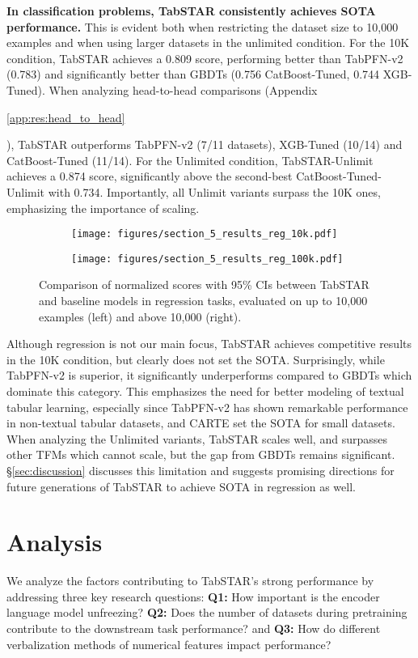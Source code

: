 \documentclass{article}
\newif\ifappendicesincluded
\newcommand{\appref}[1]{%
  \ifappendicesincluded
    \ref{#1}%
  \else
    \ref*{#1}%
  \fi
}
\begin{document}
\textbf{In classification problems, TabSTAR consistently achieves SOTA performance.} This is evident both when restricting the dataset size to 10,000 examples and when using larger datasets in the unlimited condition. For the 10K condition, TabSTAR achieves a 0.809 score, performing better than TabPFN-v2 (0.783) and significantly better than GBDTs (0.756 CatBoost-Tuned, 0.744 XGB-Tuned). When analyzing head-to-head comparisons (Appendix~\appref{app:res:head_to_head}), TabSTAR outperforms TabPFN-v2 (7/11 datasets), XGB-Tuned (10/14) and CatBoost-Tuned (11/14). For the Unlimited condition, TabSTAR-Unlimit achieves a 0.874 score, significantly above the second-best CatBoost-Tuned-Unlimit with 0.734. Importantly, all Unlimit variants surpass the 10K ones, emphasizing the importance of scaling.

\begin{figure}[h]
  \centering
  \begin{subfigure}{0.48\textwidth}
    \centering
   \texttt{[image: figures/section\_5\_results\_reg\_10k.pdf]}
  \end{subfigure}
  \hfill
  \begin{subfigure}{0.48\textwidth}
    \centering
    \texttt{[image: figures/section\_5\_results\_reg\_100k.pdf]}
  \end{subfigure}
  \caption{Comparison of normalized scores with 95\% CIs between TabSTAR and baseline models in regression tasks, evaluated on up to 10,000 examples (left) and above 10,000 (right).}
  \label{fig:main_results_regression}
\end{figure}

Although regression is not our main focus, TabSTAR achieves competitive results in the 10K condition, but clearly does not set the SOTA. Surprisingly, while TabPFN-v2 is superior, it significantly underperforms compared to GBDTs which dominate this category. This emphasizes the need for better modeling of textual tabular learning, especially since TabPFN-v2 has shown remarkable performance in non-textual tabular datasets, and CARTE set the SOTA for small datasets. When analyzing the Unlimited variants, TabSTAR scales well, and surpasses other TFMs which cannot scale, but the gap from GBDTs remains significant. \S\ref{sec:discussion} discusses this limitation and suggests promising directions for future generations of TabSTAR to achieve SOTA in regression as well.

\section{Analysis}\label{sec:analysis}
We analyze the factors contributing to TabSTAR’s strong performance by addressing three key research questions: \textbf{Q1:} How important is the encoder language model unfreezing? \textbf{Q2:} Does the number of datasets during pretraining contribute to the downstream task performance? 
and \textbf{Q3:} How do different verbalization methods of numerical features impact performance?
\end{document}
